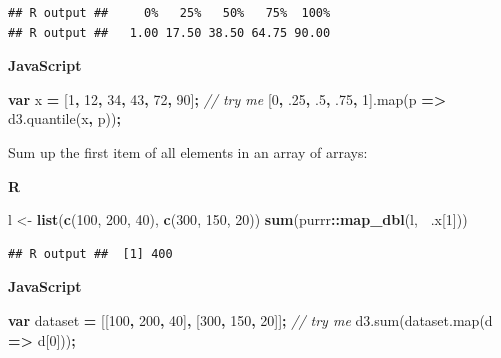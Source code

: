 \documentclass[openany]{book}
\newenvironment{Shaded}{\begin{snugshade}}{\end{snugshade}}
\newcommand{\AttributeTok}[1]{\textcolor[rgb]{0.77,0.63,0.00}{#1}}
\newcommand{\CommentTok}[1]{\textcolor[rgb]{0.56,0.35,0.01}{\textit{#1}}}
\newcommand{\DecValTok}[1]{\textcolor[rgb]{0.00,0.00,0.81}{#1}}
\newcommand{\FloatTok}[1]{\textcolor[rgb]{0.00,0.00,0.81}{#1}}
\newcommand{\KeywordTok}[1]{\textcolor[rgb]{0.13,0.29,0.53}{\textbf{#1}}}
\newcommand{\NormalTok}[1]{#1}
\newcommand{\OperatorTok}[1]{\textcolor[rgb]{0.81,0.36,0.00}{\textbf{#1}}}
\newcommand{\StringTok}[1]{\textcolor[rgb]{0.31,0.60,0.02}{#1}}
\newcommand{\VariableTok}[1]{\textcolor[rgb]{0.00,0.00,0.00}{#1}}
\begin{document}
\begin{verbatim}
## R output ##     0%   25%   50%   75%  100% 
## R output ##   1.00 17.50 38.50 64.75 90.00
\end{verbatim}

\textbf{JavaScript}

\begin{Shaded}
\begin{Highlighting}[]
\KeywordTok{var}\NormalTok{ x }\OperatorTok{=}\NormalTok{ [}\DecValTok{1}\OperatorTok{,} \DecValTok{12}\OperatorTok{,} \DecValTok{34}\OperatorTok{,} \DecValTok{43}\OperatorTok{,} \DecValTok{72}\OperatorTok{,} \DecValTok{90}\NormalTok{]}\OperatorTok{;}      \CommentTok{// try me}
\NormalTok{[}\DecValTok{0}\OperatorTok{,} \FloatTok{.25}\OperatorTok{,} \FloatTok{.5}\OperatorTok{,} \FloatTok{.75}\OperatorTok{,} \DecValTok{1}\NormalTok{].}\AttributeTok{map}\NormalTok{(p }\OperatorTok{=>} \VariableTok{d3}\NormalTok{.}\AttributeTok{quantile}\NormalTok{(x}\OperatorTok{,}\NormalTok{ p))}\OperatorTok{;}
\end{Highlighting}
\end{Shaded}

Sum up the first item of all elements in an array of arrays:

\textbf{R}

\begin{Shaded}
\begin{Highlighting}[]
\NormalTok{l <-}\StringTok{ }\KeywordTok{list}\NormalTok{(}\KeywordTok{c}\NormalTok{(}\DecValTok{100}\NormalTok{, }\DecValTok{200}\NormalTok{, }\DecValTok{40}\NormalTok{), }\KeywordTok{c}\NormalTok{(}\DecValTok{300}\NormalTok{, }\DecValTok{150}\NormalTok{, }\DecValTok{20}\NormalTok{))}
\KeywordTok{sum}\NormalTok{(purrr}\OperatorTok{::}\KeywordTok{map_dbl}\NormalTok{(l, }\OperatorTok{~}\NormalTok{.x[}\DecValTok{1}\NormalTok{]))}
\end{Highlighting}
\end{Shaded}

\begin{verbatim}
## R output ##  [1] 400
\end{verbatim}

\textbf{JavaScript}

\begin{Shaded}
\begin{Highlighting}[]
\KeywordTok{var}\NormalTok{ dataset }\OperatorTok{=}\NormalTok{ [[}\DecValTok{100}\OperatorTok{,} \DecValTok{200}\OperatorTok{,} \DecValTok{40}\NormalTok{]}\OperatorTok{,}\NormalTok{ [}\DecValTok{300}\OperatorTok{,} \DecValTok{150}\OperatorTok{,} \DecValTok{20}\NormalTok{]]}\OperatorTok{;}     \CommentTok{// try me}
\VariableTok{d3}\NormalTok{.}\AttributeTok{sum}\NormalTok{(}\VariableTok{dataset}\NormalTok{.}\AttributeTok{map}\NormalTok{(d }\OperatorTok{=>}\NormalTok{ d[}\DecValTok{0}\NormalTok{]))}\OperatorTok{;}
\end{Highlighting}
\end{Shaded}
\end{document}
